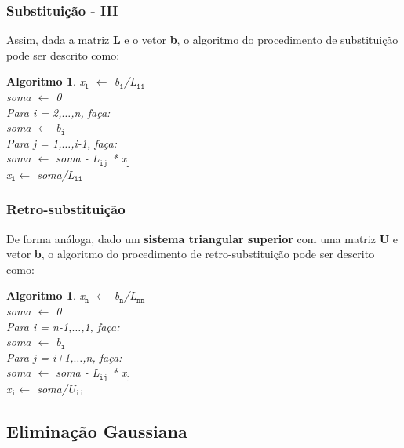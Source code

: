\documentclass{beamer}
\theoremstyle{mystyle}
\newtheorem{algoritmo}[theorem]{Algoritmo}
\begin{document}
\begin{frame}
	\frametitle{Substituição - III}
	Assim, dada a matriz \textbf{L} e o vetor \textbf{b}, o algoritmo do procedimento de substituição pode ser descrito como:
	\begin{algoritmo}
		x$ _{\texttt{1}}$ $\leftarrow$ b$ _{\texttt{1}}$/L$ _{\texttt{11}}$\\
		soma $\leftarrow$ 0\\
		Para i = 2,$\ldots$,n, faça:\\
		\quad soma $\leftarrow$ b$ _{\texttt{i}}$\\
		\quad Para j = 1,$\ldots$,i-1, faça:\\
		\quad\quad soma $\leftarrow$ soma - L$ _{\texttt{ij}}$ * x$ _{\texttt{j}} $ \\
		\quad x$ _{\texttt{i}} \leftarrow$ soma/L$ _{\texttt{ii}}$
	\end{algoritmo}
\end{frame}

\begin{frame}
	\frametitle{Retro-substituição}
	De forma análoga, dado um \textbf{sistema triangular superior} com uma matriz \textbf{U} e vetor \textbf{b}, o algoritmo do procedimento de retro-substituição pode ser descrito como:
	\begin{algoritmo}
		x$ _{\texttt{n}}$ $\leftarrow$ b$ _{\texttt{n}}$/L$ _{\texttt{nn}}$\\
		soma $\leftarrow$ 0\\
		Para i = n-1,$\ldots$,1, faça:\\
		\quad soma $\leftarrow$ b$ _{\texttt{i}}$\\
		\quad Para j = i+1,$\ldots$,n, faça:\\
		\quad\quad soma $\leftarrow$ soma - L$ _{\texttt{ij}}$ * x$ _{\texttt{j}} $ \\
		\quad x$ _{\texttt{i}} \leftarrow$ soma/U$ _{\texttt{ii}}$
	\end{algoritmo}
\end{frame}

\subsection{Eliminação Gaussiana}
\end{document}

